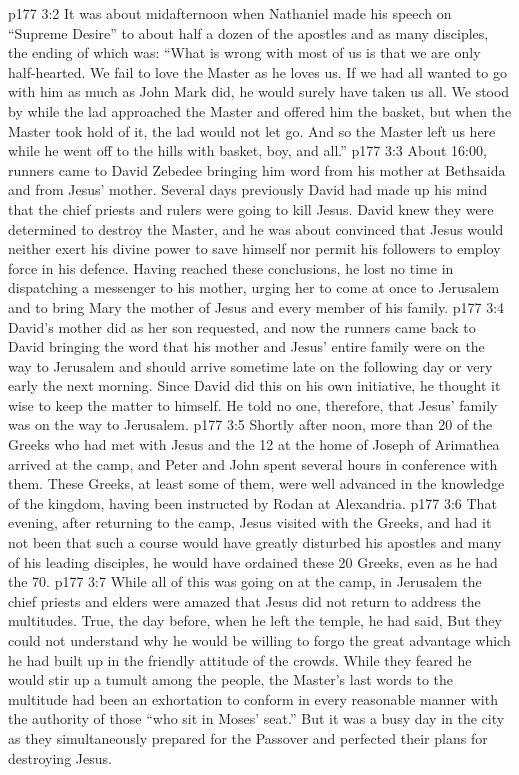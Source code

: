 \vs p177 3:2 \pc It was about midafternoon when Nathaniel made his speech on “Supreme Desire” to about half a dozen of the apostles and as many disciples, the ending of which was: “What is wrong with most of us is that we are only half\hyp{}hearted. We fail to love the Master as he loves us. If we had all wanted to go with him as much as John Mark did, he would surely have taken us all. We stood by while the lad approached the Master and offered him the basket, but when the Master took hold of it, the lad would not let go. And so the Master left us here while he went off to the hills with basket, boy, and all.”
\vs p177 3:3 \pc About 16:00, runners came to David Zebedee bringing him word from his mother at Bethsaida and from Jesus’ mother. Several days previously David had made up his mind that the chief priests and rulers were going to kill Jesus. David knew they were determined to destroy the Master, and he was about convinced that Jesus would neither exert his divine power to save himself nor permit his followers to employ force in his defence. Having reached these conclusions, he lost no time in dispatching a messenger to his mother, urging her to come at once to Jerusalem and to bring Mary the mother of Jesus and every member of his family.
\vs p177 3:4 David’s mother did as her son requested, and now the runners came back to David bringing the word that his mother and Jesus’ entire family were on the way to Jerusalem and should arrive sometime late on the following day or very early the next morning. Since David did this on his own initiative, he thought it wise to keep the matter to himself. He told no one, therefore, that Jesus’ family was on the way to Jerusalem.
\vs p177 3:5 \pc Shortly after noon, more than 20 of the Greeks who had met with Jesus and the 12 at the home of Joseph of Arimathea arrived at the camp, and Peter and John spent several hours in conference with them. These Greeks, at least some of them, were well advanced in the knowledge of the kingdom, having been instructed by Rodan at Alexandria.
\vs p177 3:6 That evening, after returning to the camp, Jesus visited with the Greeks, and had it not been that such a course would have greatly disturbed his apostles and many of his leading disciples, he would have ordained these 20 Greeks, even as he had the 70.
\vs p177 3:7 \pc While all of this was going on at the camp, in Jerusalem the chief priests and elders were amazed that Jesus did not return to address the multitudes. True, the day before, when he left the temple, he had said,  But they could not understand why he would be willing to forgo the great advantage which he had built up in the friendly attitude of the crowds. While they feared he would stir up a tumult among the people, the Master’s last words to the multitude had been an exhortation to conform in every reasonable manner with the authority of those “who sit in Moses’ seat.” But it was a busy day in the city as they simultaneously prepared for the Passover and perfected their plans for destroying Jesus.
